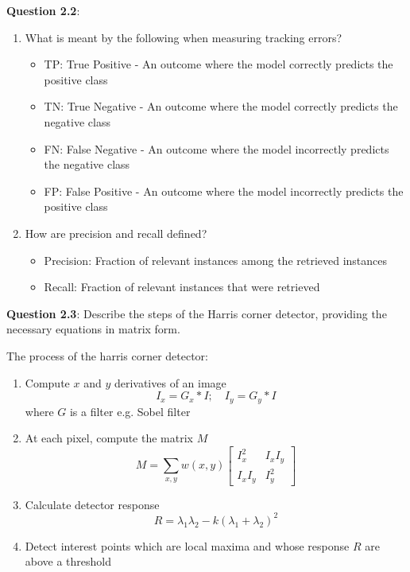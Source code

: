 \documentclass{article}
\begin{document}
    \textbf{Question 2.2}: 
    \begin{enumerate}
        \item What is meant by the following when measuring tracking errors?
        \begin{itemize}
            \item TP: True Positive - An outcome where the model correctly predicts the positive class
            \item TN: True Negative - An outcome where the model correctly predicts the negative class
            \item FN: False Negative - An outcome where the model incorrectly predicts the negative class
            \item FP: False Positive - An outcome where the model incorrectly predicts the positive class
        \end{itemize}

        \item How are precision and recall defined?
        \begin{itemize}
            \item Precision: Fraction of relevant instances among the retrieved instances
            \item Recall: Fraction of relevant instances that were retrieved
        \end{itemize}
    \end{enumerate}

    \textbf{Question 2.3}: Describe the steps of the Harris corner detector, providing the necessary
    equations in matrix form.

    The process of the harris corner detector: 
    \begin{enumerate}
        \item Compute $x$ and $y$ derivatives of an image
        $$
            I_x = G_x \ast I; \quad I_y = G_y \ast I
        $$
        where $G$ is a filter e.g. Sobel filter 

        \item At each pixel, compute the matrix $M$
        $$
            M = \sum_{x,y} w(x,y) \begin{bmatrix}
                I_x^2 & I_x I_y \\ 
                I_x I_y & I_y^2
            \end{bmatrix}
        $$

        \item Calculate detector response
        $$
            R = \lambda_1 \lambda_2 - k(\lambda_1 + \lambda_2)^2
        $$

        \item Detect interest points which are local maxima and whose response $R$ are
        above a threshold
    \end{enumerate}
\end{document}
